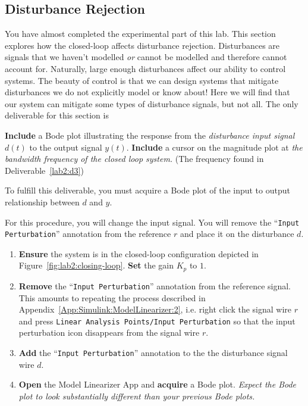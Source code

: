 \subsection{Disturbance Rejection}
You have almost completed the experimental part of this lab. This section
explores how the closed-loop affects disturbance rejection. Disturbances are
signals that we haven't modelled \emph{or} cannot be modelled and therefore
cannot account for. Naturally, large enough disturbances affect our ability to
control systems. The beauty of control is that we can design systems that
mitigate disturbances we do not explicitly model or know about! Here we will
find that our system can mitigate some types of disturbance signals, but not
all. The only deliverable for this section is
%
\begin{deliverable}[label={lab2:d4}]
  \textbf{Include} a Bode plot illustrating the response from the
  \emph{disturbance input signal} \(d(t)\) to the output signal \(y(t).\)
  \textbf{Include} a cursor on the magnitude plot at \emph{the bandwidth
  frequency of the closed loop system.} (The frequency found in
  Deliverable~\ref{lab2:d3})
\end{deliverable}
%
To fulfill this deliverable, you must acquire a Bode plot of the input to
output relationship between \(d\) and \(y.\)
%
\begin{procedure}[label={proc:lab2:p5}]
  For this procedure, you will change the input signal. You will remove the
  ``\texttt{Input Perturbation}'' annotation from the reference \(r\) and
  place it on the disturbance \(d.\)

  \begin{enumerate}[label=(\arabic*)]
    \item{
      \textbf{Ensure} the system is in the closed-loop configuration
      depicted in Figure~\ref{fig:lab2:closing-loop}.
      \textbf{Set} the gain \(K_p\) to \(1.\)
    }
    \item{
      \textbf{Remove} the ``\texttt{Input Perturbation}'' annotation from
      the reference signal. This amounts to repeating the process described
      in Appendix~\ref{App:Simulink:ModelLinearizer:2}, i.e. right click the
      signal wire \(r\) and press
      \texttt{Linear Analysis Points/Input Perturbation} so that the
      input perturbation icon disappears from the signal wire \(r.\)
    }
    \item{
      \textbf{Add} the ``\texttt{Input Perturbation}'' annotation to the
      the disturbance signal wire \(d.\)
    }
    \item{
      \textbf{Open} the Model Linearizer App and \textbf{acquire} a Bode
      plot. \emph{Expect the Bode plot to look substantially different than
      your previous Bode plots.}
    }
  \end{enumerate}
\end{procedure}

